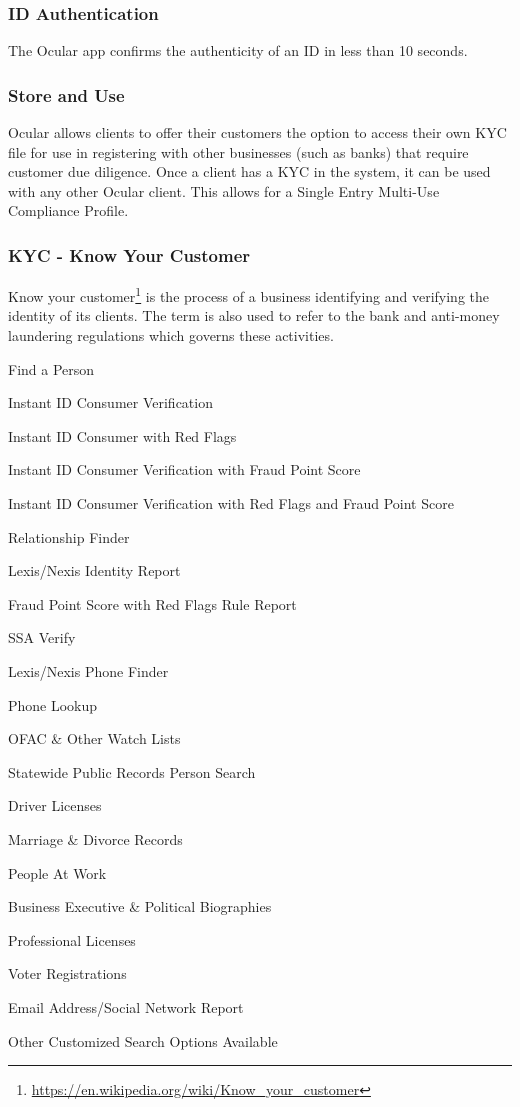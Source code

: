 \documentclass[a4paper]{article}
\let\tempone\itemize
\let\temptwo\enditemize
\renewenvironment{itemize}{\tempone\addtolength{\itemsep}{-5pt}}{\temptwo}
\begin{document}
\subsubsection*{ID Authentication}
The Ocular app confirms the authenticity of an ID in less than 10 seconds.

\subsubsection*{Store and Use}
Ocular allows clients to offer their customers the option to access their own KYC file for use in registering with other businesses (such as banks) that require customer due diligence. Once a client has a KYC in the system, it can be used with any other Ocular client. This allows for a Single Entry Multi-Use Compliance Profile.

\subsubsection*{KYC - Know Your Customer}
Know your customer\footnote{\url{https://en.wikipedia.org/wiki/Know\_your\_customer}} is the process of a business identifying and verifying the identity of its clients. The term is also used to refer to the bank and anti-money laundering regulations which governs these activities.

\begin{itemize}
\item Find a Person
\item Instant ID Consumer Verification
\item Instant ID Consumer with Red Flags
\item Instant ID Consumer Verification with Fraud Point Score
\item Instant ID Consumer Verification with Red Flags and Fraud Point Score
\item Relationship Finder
\item Lexis/Nexis Identity Report
\item Fraud Point Score with Red Flags Rule Report
\item SSA Verify
\item Lexis/Nexis Phone Finder
\item Phone Lookup
\item OFAC \& Other Watch Lists
\item Statewide Public Records Person Search
\item Driver Licenses
\item Marriage \& Divorce Records
\item People At Work
\item Business Executive \& Political Biographies
\item Professional Licenses
\item Voter Registrations
\item Email Address/Social Network Report
\item Other Customized Search Options Available 
\end{itemize}
\end{document}
